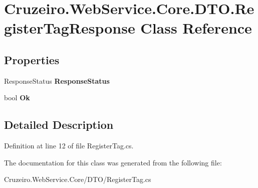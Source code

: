 \hypertarget{class_cruzeiro_1_1_web_service_1_1_core_1_1_d_t_o_1_1_register_tag_response}{}\section{Cruzeiro.\+Web\+Service.\+Core.\+D\+T\+O.\+Register\+Tag\+Response Class Reference}
\label{class_cruzeiro_1_1_web_service_1_1_core_1_1_d_t_o_1_1_register_tag_response}
\subsection*{Properties}
\begin{DoxyCompactItemize}
\item 
Response\+Status {\bfseries Response\+Status}\hypertarget{class_cruzeiro_1_1_web_service_1_1_core_1_1_d_t_o_1_1_register_tag_response_a3955896ea921addf0dcc7c03921d84b9}{}\label{class_cruzeiro_1_1_web_service_1_1_core_1_1_d_t_o_1_1_register_tag_response_a3955896ea921addf0dcc7c03921d84b9}

\item 
bool {\bfseries Ok}\hypertarget{class_cruzeiro_1_1_web_service_1_1_core_1_1_d_t_o_1_1_register_tag_response_ab9d3431f6d0faed6c32073349fb5f9e5}{}\label{class_cruzeiro_1_1_web_service_1_1_core_1_1_d_t_o_1_1_register_tag_response_ab9d3431f6d0faed6c32073349fb5f9e5}

\end{DoxyCompactItemize}


\subsection{Detailed Description}


Definition at line 12 of file Register\+Tag.\+cs.



The documentation for this class was generated from the following file\+:\begin{DoxyCompactItemize}
\item 
Cruzeiro.\+Web\+Service.\+Core/\+D\+T\+O/Register\+Tag.\+cs\end{DoxyCompactItemize}
